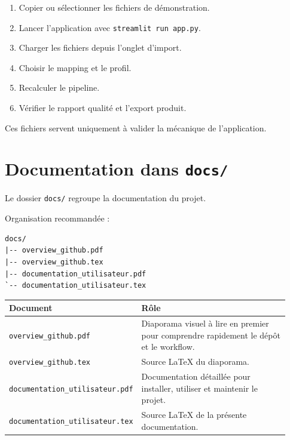 \documentclass[11pt,a4paper]{article}
\newcommand{\code}[1]{\texttt{#1}}
\begin{document}
\begin{enumerate}
  \item Copier ou sélectionner les fichiers de démonstration.
  \item Lancer l'application avec \code{streamlit run app.py}.
  \item Charger les fichiers depuis l'onglet d'import.
  \item Choisir le mapping et le profil.
  \item Recalculer le pipeline.
  \item Vérifier le rapport qualité et l'export produit.
\end{enumerate}

Ces fichiers servent uniquement à valider la mécanique de l'application.

\section{Documentation dans \code{docs/}}

Le dossier \code{docs/} regroupe la documentation du projet.

Organisation recommandée :

\begin{lstlisting}
docs/
|-- overview_github.pdf
|-- overview_github.tex
|-- documentation_utilisateur.pdf
`-- documentation_utilisateur.tex
\end{lstlisting}

\begin{longtable}{p{0.35\linewidth} p{0.58\linewidth}}
\toprule
\textbf{Document} & \textbf{Rôle} \\
\midrule
\endhead

\code{overview\_github.pdf} &
Diaporama visuel à lire en premier pour comprendre rapidement le dépôt et le workflow. \\

\code{overview\_github.tex} &
Source \LaTeX{} du diaporama. \\

\code{documentation\_utilisateur.pdf} &
Documentation détaillée pour installer, utiliser et maintenir le projet. \\

\code{documentation\_utilisateur.tex} &
Source \LaTeX{} de la présente documentation. \\

\bottomrule
\end{longtable}
\end{document}
